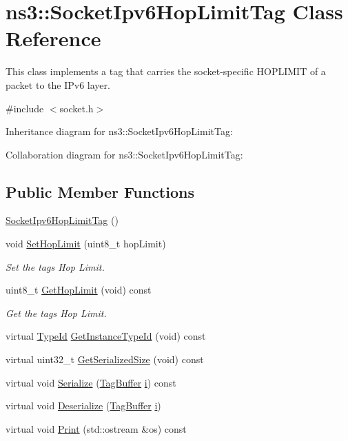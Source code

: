 \hypertarget{classns3_1_1SocketIpv6HopLimitTag}{}\section{ns3\+:\+:Socket\+Ipv6\+Hop\+Limit\+Tag Class Reference}
\label{classns3_1_1SocketIpv6HopLimitTag}


This class implements a tag that carries the socket-\/specific H\+O\+P\+L\+I\+M\+IT of a packet to the I\+Pv6 layer.  




{\ttfamily \#include $<$socket.\+h$>$}



Inheritance diagram for ns3\+:\+:Socket\+Ipv6\+Hop\+Limit\+Tag\+:


Collaboration diagram for ns3\+:\+:Socket\+Ipv6\+Hop\+Limit\+Tag\+:
\subsection*{Public Member Functions}
\begin{DoxyCompactItemize}
\item 
\hyperlink{classns3_1_1SocketIpv6HopLimitTag_a5e6d4c1f23c0c80fc4f5545fa2b204dd}{Socket\+Ipv6\+Hop\+Limit\+Tag} ()
\item 
void \hyperlink{classns3_1_1SocketIpv6HopLimitTag_a788df60ac4c987e997e15ba8cb691b60}{Set\+Hop\+Limit} (uint8\+\_\+t hop\+Limit)
\begin{DoxyCompactList}\small\item\em Set the tag\textquotesingle{}s Hop Limit. \end{DoxyCompactList}\item 
uint8\+\_\+t \hyperlink{classns3_1_1SocketIpv6HopLimitTag_a48ad3f9992a5a6cc2a43021461b6dd3c}{Get\+Hop\+Limit} (void) const 
\begin{DoxyCompactList}\small\item\em Get the tag\textquotesingle{}s Hop Limit. \end{DoxyCompactList}\item 
virtual \hyperlink{classns3_1_1TypeId}{Type\+Id} \hyperlink{classns3_1_1SocketIpv6HopLimitTag_a694fccb572c0835968122011337e8895}{Get\+Instance\+Type\+Id} (void) const 
\item 
virtual uint32\+\_\+t \hyperlink{classns3_1_1SocketIpv6HopLimitTag_a9224dc9723f2630ef4510d4dec20796f}{Get\+Serialized\+Size} (void) const 
\item 
virtual void \hyperlink{classns3_1_1SocketIpv6HopLimitTag_a6ba848510e1c106a65e5b53d7fbf7679}{Serialize} (\hyperlink{classns3_1_1TagBuffer}{Tag\+Buffer} \hyperlink{lte__uplink__power__control_8m_a6f6ccfcf58b31cb6412107d9d5281426}{i}) const 
\item 
virtual void \hyperlink{classns3_1_1SocketIpv6HopLimitTag_a2196a3ea2298c4b0c1bf16b9fee36d07}{Deserialize} (\hyperlink{classns3_1_1TagBuffer}{Tag\+Buffer} \hyperlink{lte__uplink__power__control_8m_a6f6ccfcf58b31cb6412107d9d5281426}{i})
\item 
virtual void \hyperlink{classns3_1_1SocketIpv6HopLimitTag_a644c5a3950fb4459a79141baf1391945}{Print} (std\+::ostream \&os) const 
\end{DoxyCompactItemize}
